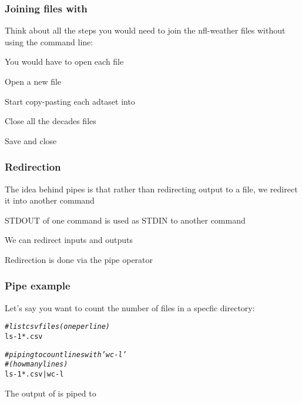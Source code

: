 \documentclass[12pt]{beamer}\usepackage[]{graphicx}\usepackage[]{color}
\makeatletter
\newcommand{\hlnum}[1]{\textcolor[rgb]{0.686,0.059,0.569}{#1}}%
\newcommand{\hlcom}[1]{\textcolor[rgb]{0.678,0.584,0.686}{\textit{#1}}}%
\newcommand{\hlopt}[1]{\textcolor[rgb]{0,0,0}{#1}}%
\newcommand{\hlstd}[1]{\textcolor[rgb]{0.345,0.345,0.345}{#1}}%
\newenvironment{kframe}{%
 \def\at@end@of@kframe{}%
 \ifinner\ifhmode%
  \def\at@end@of@kframe{\end{minipage}}%
  \begin{minipage}{\columnwidth}%
 \fi\fi%
 \def\FrameCommand##1{\hskip\@totalleftmargin \hskip-\fboxsep
 \colorbox{shadecolor}{##1}\hskip-\fboxsep
     \hskip-\linewidth \hskip-\@totalleftmargin \hskip\columnwidth}%
 \MakeFramed {\advance\hsize-\width
   \@totalleftmargin\z@ \linewidth\hsize
   \@setminipage}}%
 {\par\unskip\endMakeFramed%
 \at@end@of@kframe}
\newenvironment{knitrout}{}{} %
\makeatother
\begin{document}

\begin{frame}
\frametitle{Joining files with }

Think about all the steps you would need to join the nfl-weather files without using the command line:
\bi
  \item You would have to open each file
  \item Open a new file 
  \item Start copy-pasting each adtaset into 
  \item Close all the decades files
  \item Save and close 
\ei

\end{frame}


\begin{frame}
\begin{center}
\Huge{}
\end{center}
\end{frame}


\begin{frame}
\frametitle{Redirection}

\bbi
  \item The idea behind pipes is that rather than redirecting output to a file, we redirect it into another command
  \item STDOUT of one command is used as STDIN to another command
  \item We can redirect inputs and outputs
  \item Redirection is done via the {\hilit \code{|}} pipe operator
\ei

\end{frame}


\begin{frame}[fragile]
\frametitle{Pipe example}

Let's say you want to count the number of  files in a specfic directory:
\begin{knitrout}\footnotesize
{}\color{fgcolor}\begin{kframe}
\begin{alltt}
\hlcom{# list csv files (one per line)}
\hlstd{ls} \hlopt{-}\hlnum{1} \hlopt{*}\hlstd{.csv}

\hlcom{# piping to count lines with 'wc -l'}
\hlcom{# (how many lines)}
\hlstd{ls} \hlopt{-}\hlnum{1} \hlopt{*}\hlstd{.csv} \hlopt{|} \hlstd{wc} \hlopt{-}\hlstd{l}
\end{alltt}
\end{kframe}
\end{knitrout}

The output of  is piped to 

\end{frame}
\end{document}
